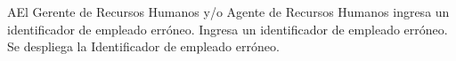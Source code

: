 \begin{UCtrayectoriaA}{A}{El Gerente de Recursos Humanos y/o Agente de Recursos Humanos ingresa un identificador de empleado erróneo.}
\UCpaso [\UCactor] Ingresa un identificador de empleado erróneo.
\UCpaso Se despliega la  Identificador de empleado erróneo.
\end{UCtrayectoriaA}



